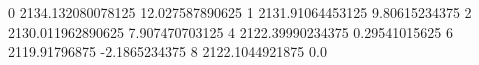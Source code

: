 0 2134.132080078125 12.027587890625
1 2131.91064453125 9.80615234375
2 2130.011962890625 7.907470703125
4 2122.39990234375 0.29541015625
6 2119.91796875 -2.1865234375
8 2122.1044921875 0.0

